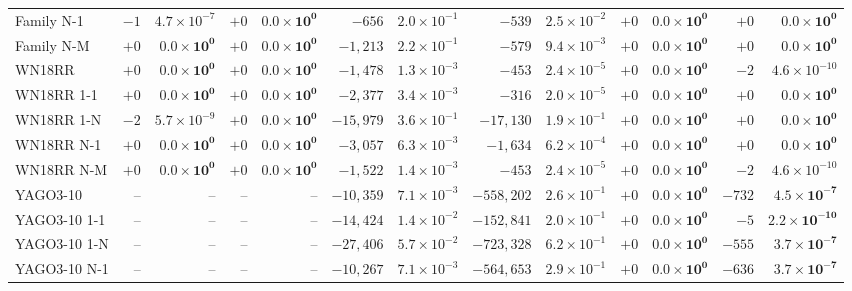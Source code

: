 \begin{tabular}{lrrrr|rrrr|rrrr}
Family N-1 & $-1$ & $4.7\times10^{-7}$ & $+0$ & $\mathbf{0.0\times10^{0}}$ & $-656$ & $2.0\times10^{-1}$ & $-539$ & $2.5\times10^{-2}$ & $+0$ & $\mathbf{0.0\times10^{0}}$ & $+0$ & $\mathbf{0.0\times10^{0}}$ \\
Family N-M & $+0$ & $\mathbf{0.0\times10^{0}}$ & $+0$ & $\mathbf{0.0\times10^{0}}$ & $-1{,}213$ & $2.2\times10^{-1}$ & $-579$ & $9.4\times10^{-3}$ & $+0$ & $\mathbf{0.0\times10^{0}}$ & $+0$ & $\mathbf{0.0\times10^{0}}$ \\
\midrule
WN18RR & $+0$ & $\mathbf{0.0\times10^{0}}$ & $+0$ & $\mathbf{0.0\times10^{0}}$ & $-1{,}478$ & $1.3\times10^{-3}$ & $-453$ & $2.4\times10^{-5}$ & $+0$ & $\mathbf{0.0\times10^{0}}$ & $-2$ & $4.6\times10^{-10}$ \\
WN18RR 1-1 & $+0$ & $\mathbf{0.0\times10^{0}}$ & $+0$ & $\mathbf{0.0\times10^{0}}$ & $-2{,}377$ & $3.4\times10^{-3}$ & $-316$ & $2.0\times10^{-5}$ & $+0$ & $\mathbf{0.0\times10^{0}}$ & $+0$ & $\mathbf{0.0\times10^{0}}$ \\
WN18RR 1-N & $-2$ & $5.7\times10^{-9}$ & $+0$ & $\mathbf{0.0\times10^{0}}$ & $-15{,}979$ & $3.6\times10^{-1}$ & $-17{,}130$ & $1.9\times10^{-1}$ & $+0$ & $\mathbf{0.0\times10^{0}}$ & $+0$ & $\mathbf{0.0\times10^{0}}$ \\
WN18RR N-1 & $+0$ & $\mathbf{0.0\times10^{0}}$ & $+0$ & $\mathbf{0.0\times10^{0}}$ & $-3{,}057$ & $6.3\times10^{-3}$ & $-1{,}634$ & $6.2\times10^{-4}$ & $+0$ & $\mathbf{0.0\times10^{0}}$ & $+0$ & $\mathbf{0.0\times10^{0}}$ \\
WN18RR N-M & $+0$ & $\mathbf{0.0\times10^{0}}$ & $+0$ & $\mathbf{0.0\times10^{0}}$ & $-1{,}522$ & $1.4\times10^{-3}$ & $-453$ & $2.4\times10^{-5}$ & $+0$ & $\mathbf{0.0\times10^{0}}$ & $-2$ & $4.6\times10^{-10}$ \\
\midrule
YAGO3-10 & – & – & – & – & $-10{,}359$ & $7.1\times10^{-3}$ & $-558{,}202$ & $2.6\times10^{-1}$ & $+0$ & $\mathbf{0.0\times10^{0}}$ & $-732$ & $\mathbf{4.5\times10^{-7}}$ \\
YAGO3-10 1-1 & – & – & – & – & $-14{,}424$ & $1.4\times10^{-2}$ & $-152{,}841$ & $2.0\times10^{-1}$ & $+0$ & $\mathbf{0.0\times10^{0}}$ & $-5$ & $\mathbf{2.2\times10^{-10}}$ \\
YAGO3-10 1-N & – & – & – & – & $-27{,}406$ & $5.7\times10^{-2}$ & $-723{,}328$ & $6.2\times10^{-1}$ & $+0$ & $\mathbf{0.0\times10^{0}}$ & $-555$ & $\mathbf{3.7\times10^{-7}}$ \\
YAGO3-10 N-1 & – & – & – & – & $-10{,}267$ & $7.1\times10^{-3}$ & $-564{,}653$ & $2.9\times10^{-1}$ & $+0$ & $\mathbf{0.0\times10^{0}}$ & $-636$ & $\mathbf{3.7\times10^{-7}}$ \\

\end{tabular}
